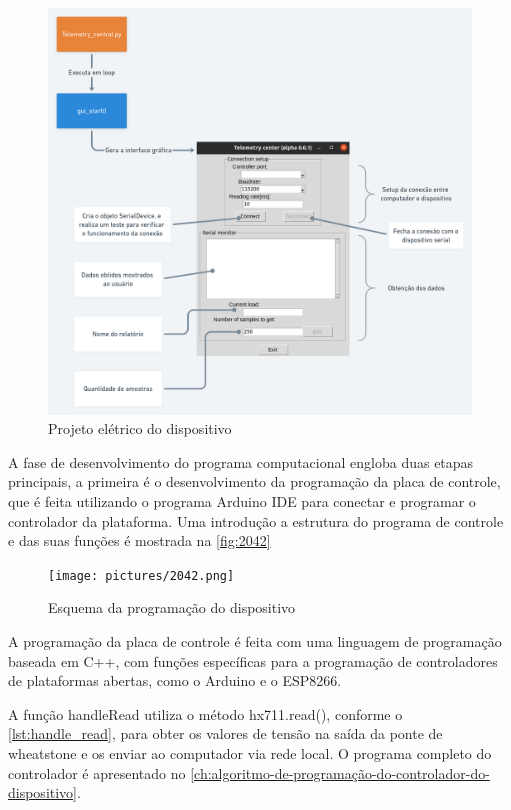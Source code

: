 \begin{figure}[H]
	\caption{\label{fig:2041} Projeto elétrico do dispositivo}
	\begin{center}
		\includegraphics[width=\textwidth]{pictures/2041.png}
	\end{center}
\end{figure}

A fase de desenvolvimento do programa computacional engloba duas etapas principais, a primeira é o desenvolvimento da programação da placa de controle,
que é feita utilizando o programa Arduino IDE para conectar e programar o controlador da plataforma.
Uma introdução a estrutura do programa de controle e das suas funções é mostrada na \autoref{fig:2042}

\begin{figure}[H]
	\caption{\label{fig:2042} Esquema da programação do dispositivo}
	\begin{center}
		\texttt{[image: pictures/2042.png]}
	\end{center}
\end{figure}

A programação da placa de controle é feita com uma linguagem de programação baseada em C++, com funções específicas para a programação de controladores de
plataformas abertas, como o Arduino e o ESP8266.

A função handleRead utiliza o método hx711.read(), conforme o \autoref{lst:handle_read}, para obter os valores de tensão na saída da ponte de wheatstone e os
enviar ao computador via rede local.
O programa completo do controlador é apresentado no \autoref{ch:algoritmo-de-programação-do-controlador-do-dispositivo}.

